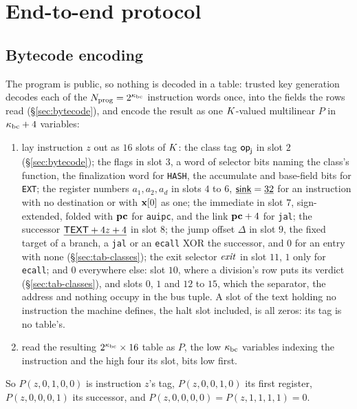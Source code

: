 \section{End-to-end protocol}\label{sec:e2e}

\subsection{Bytecode encoding}\label{sec:e2e-bc}

The program is public, so nothing is decoded in a table: trusted key generation decodes each of the $N_{\mathrm{prog}}=2^{\kappa_{\mathrm{bc}}}$ instruction words once, into the fields the rows read (\S\ref{sec:bytecode}), and encode the result as one $K$-valued multilinear $P$ in $\kappa_{\mathrm{bc}}+4$ variables:
\begin{enumerate}[itemsep=1pt,topsep=3pt]
\item lay instruction $z$ out as $16$ slots of $K$: the class tag $\mathsf{op}_{\mathsf{j}}$ in slot $2$ (\S\ref{sec:bytecode}); the flags in slot $3$, a word of selector bits naming the class's function, the finalization word for \texttt{HASH}, the accumulate and base-field bits for \texttt{EXT}; the register numbers $a_1,a_2,a_d$ in slots $4$ to $6$, $\underline{\mathsf{sink}}=\underline{32}$ for an instruction with no destination or with $\mathbf{x}[0]$ as one; the immediate in slot $7$, sign-extended, folded with $\mathbf{pc}$ for \texttt{auipc}, and the link $\mathbf{pc}+4$ for \texttt{jal}; the successor $\underline{\mathsf{TEXT}+4z+4}$ in slot $8$; the jump offset $\Delta$ in slot $9$, the fixed target of a branch, a \texttt{jal} or an \texttt{ecall} XOR the successor, and $0$ for an entry with none (\S\ref{sec:tab-classes}); the exit selector $\mathit{exit}$ in slot $11$, $1$ only for \texttt{ecall}; and $0$ everywhere else: slot $10$, where a division's row puts its verdict (\S\ref{sec:tab-classes}), and slots $0$, $1$ and $12$ to $15$, which the separator, the address and nothing occupy in the bus tuple. A slot of the text holding no instruction the machine defines, the halt slot included, is all zeros: its tag is no table's.
\item read the resulting $2^{\kappa_{\mathrm{bc}}}\times16$ table as $P$, the low $\kappa_{\mathrm{bc}}$ variables indexing the instruction and the high four its slot, bits low first.
\end{enumerate}
So $P(z,0,1,0,0)$ is instruction $z$'s tag, $P(z,0,0,1,0)$ its first register, $P(z,0,0,0,1)$ its successor, and $P(z,0,0,0,0)=P(z,1,1,1,1)=0$.

